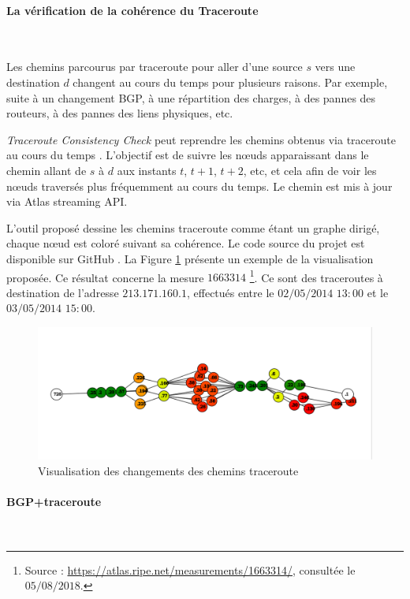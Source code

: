 \paragraph{La vérification de la cohérence du Traceroute}~

Les chemins parcourus par traceroute pour aller d'une source $s$ vers une destination $d$ changent au cours du temps pour plusieurs raisons. Par exemple, suite   à un changement BGP, à une  répartition des charges, à des pannes des routeurs,  à des pannes des liens physiques, etc.

\textit{Traceroute Consistency Check} peut reprendre les chemins obtenus via traceroute au cours du temps . L'objectif est de suivre les  n\oe{}uds apparaissant dans le chemin allant de  $s$ à $d$ aux instants $t$, $t+1$, $t+2$, etc, et cela afin de voir les n\oe{}uds traversés plus fréquemment au cours du temps. Le chemin est mis à jour via Atlas streaming API. 

L'outil proposé dessine les chemins traceroute comme étant un graphe dirigé, chaque n\oe{}ud est coloré suivant sa cohérence. Le code source du projet est disponible sur GitHub \cite{Traceroute-consistency-check}. La Figure \ref{fig:Traceroute-consistency-check} présente un exemple de la visualisation proposée. Ce résultat concerne la mesure $1663314$ \footnote{Source : \url{https://atlas.ripe.net/measurements/1663314/}, consultée le $05/08/2018$.}. Ce sont des traceroutes à destination de l'adresse $213.171.160.1$, effectués entre le $02/05/2014$ $13:00$ et le $03/05/2014$ $15:00$.

\begin{figure}[h]
	\centering
	\includegraphics[width=1\linewidth]{illustrations/traceroute-consitance.png}
	\caption{Visualisation des changements des chemins traceroute \cite{Traceroute-consistency-check}}
	\label{fig:Traceroute-consistency-check}
\end{figure}

\paragraph{BGP+traceroute} ~

